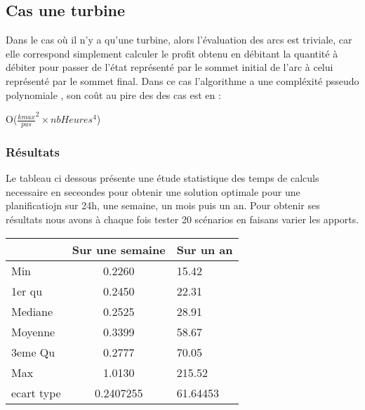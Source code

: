 \documentclass[a4paper]{report}
\begin{document}
\subsection{Cas une turbine}
Dans le cas où il n'y a qu'une turbine, alors l'évaluation des arcs est triviale, car elle correspond simplement calculer le profit obtenu en débitant la quantité à débiter pour passer de l'état représenté par le sommet initial de l'arc  à celui représenté par le sommet final.
Dans ce cas l'algorithme a une compléxité psseudo polynomiale , son coût au pire des des cas est en :\\
\begin{center}
   O($\frac{kmax}{pas}^{2}\times nbHeures^{4}$)
\end{center}
\subsubsection{Résultats}
Le tableau ci dessous présente une étude statistique des temps de calculs necessaire en seceondes pour obtenir une solution optimale pour une planificatiojn sur 24h, une semaine, un mois puis un an. Pour obtenir ses résultats nous avons à chaque fois tester 20 scénarios en faisans varier les apports.\\
\begin{tabular}{|l|c|l|}
  \hline
  &Sur une semaine &Sur un an\\
  \hline
  Min &0.2260&15.42\\
  \hline
  1er qu & 0.2450 & 22.31
\\
  \hline
  Mediane & 0.2525&28.91
\\
  \hline
  Moyenne &0.3399 & 58.67 

\\
  \hline
  3eme Qu &0.2777&70.05\\
  \hline
  Max & 1.0130 &215.52\\
\hline
 ecart type &0.2407255 &61.64453 
\\
 
  \hline
\end{tabular}
\end{document}
